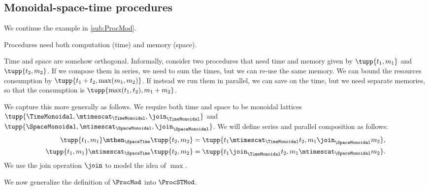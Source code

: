 
\subsection{Monoidal-space-time procedures}
\label{sub:monoidal-space-time}
We continue the example in \cref{sub:ProcMod}.

Procedures need both computation (time) and memory (space).

Time and space are somehow orthogonal.
%
Informally, consider two procedures that need time and memory given by $\tupp{t_1,m_1}$ and $\tupp{t_2, m_2}$. If we compose them in series, we need to sum the times, but we can re-use the same memory. We can bound the resources consumption  by $\tupp{t_1+t_2,\max(m_1, m_2)}$.
If instead we run them in parallel, we can save on the time, but we need separate memories, so that the consumption is $\tupp{\max(t_1,t_2), m_1 + m_2}$.

We capture this more generally as follows. We require both time and space to be monoidal lattices $\tupp{\TimeMonoidal, \mtimescat_{\TimeMonoidal}, \join_{\TimeMonoidal}}$ and
$\tupp{\SpaceMonoidal, \mtimescat_{\SpaceMonoidal}, \join_{\SpaceMonoidal}}$.
%
We will define series and parallel composition as follows:
\begin{equation}
    \begin{aligned}
        \tupp{t_1,m_1} \mthen_{\SpaceTime}  \tupp{t_2,m_2} &= \tupp{t_1 \mtimescat_{\TimeMonoidal} t_2, m_1 \join_{\SpaceMonoidal} m_2}, \\
        \tupp{t_1,m_1} \mtimescat_{\SpaceTime}  \tupp{t_2,m_2} &= \tupp{t_1 \join_{\TimeMonoidal} t_2, m_1 \mtimescat_{\SpaceMonoidal} m_2}.
    \end{aligned}
\end{equation}
We use the join operation $\join$ to model the idea of $\max$.

We now generalize the definition of $\ProcMod$ into $\ProcSTMod$.



